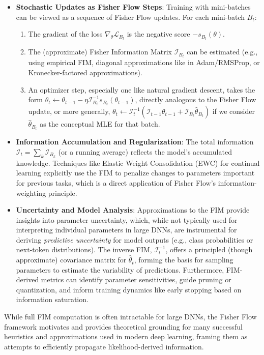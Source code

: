 \documentclass[11pt]{article}
\begin{document}
\begin{itemize}
  \item \textbf{Stochastic Updates as Fisher Flow Steps}: Training with mini-batches can be viewed as a sequence of Fisher Flow updates. For each mini-batch $B_t$:
  \begin{enumerate}
    \item The gradient of the loss $\nabla_\theta \mathcal{L}_{B_t}$ is the negative score $-s_{B_t}(\theta)$.
    \item The (approximate) Fisher Information Matrix $\mathcal{I}_{B_t}$ can be estimated (e.g., using empirical FIM, diagonal approximations like in Adam/RMSProp, or Kronecker-factored approximations).
    \item An optimizer step, especially one like natural gradient descent, takes the form $\theta_{t} \leftarrow \theta_{t-1} - \eta \mathcal{I}_{B_t}^{-1} s_{B_t}(\theta_{t-1})$, directly analogous to the Fisher Flow update, or more generally, $\theta_t \leftarrow \mathcal{I}_t^{-1}(\mathcal{I}_{t-1}\theta_{t-1} + \mathcal{I}_{B_t}\hat\theta_{B_t})$ if we consider $\hat\theta_{B_t}$ as the conceptual MLE for that batch.
  \end{enumerate}
  \item \textbf{Information Accumulation and Regularization}: The total information $\mathcal{I}_t = \sum_k \mathcal{I}_{B_k}$ (or a running average) reflects the model's accumulated knowledge. Techniques like Elastic Weight Consolidation (EWC) \cite{kirkpatrick2017overcoming} for continual learning explicitly use the FIM to penalize changes to parameters important for previous tasks, which is a direct application of Fisher Flow's information-weighting principle.
  \item \textbf{Uncertainty and Model Analysis}: Approximations to the FIM provide insights into parameter uncertainty, which, while not typically used for interpreting individual parameters in large DNNs, are instrumental for deriving \textit{predictive uncertainty} for model outputs (e.g., class probabilities or next-token distributions). The inverse FIM, $\mathcal{I}_t^{-1}$, offers a principled (though approximate) covariance matrix for $\hat{\theta}_t$, forming the basis for sampling parameters to estimate the variability of predictions. Furthermore, FIM-derived metrics can identify parameter sensitivities, guide pruning or quantization, and inform training dynamics like early stopping based on information saturation.
\end{itemize}
While full FIM computation is often intractable for large DNNs, the Fisher Flow framework motivates and provides theoretical grounding for many successful heuristics and approximations used in modern deep learning, framing them as attempts to efficiently propagate likelihood-derived information.
\end{document}
